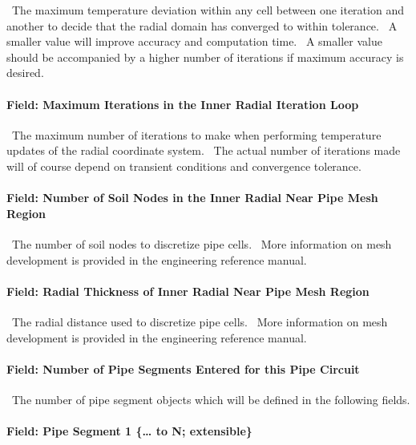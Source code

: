 ~The maximum temperature deviation within any cell between one iteration and another to decide that the radial domain has converged to within tolerance.~ A smaller value will improve accuracy and computation time.~ A smaller value should be accompanied by a higher number of iterations if maximum accuracy is desired.

\paragraph{Field: Maximum Iterations in the Inner Radial Iteration Loop}\label{field-maximum-iterations-in-the-inner-radial-iteration-loop}

~The maximum number of iterations to make when performing temperature updates of the radial coordinate system.~ The actual number of iterations made will of course depend on transient conditions and convergence tolerance.

\paragraph{Field: Number of Soil Nodes in the Inner Radial Near Pipe Mesh Region}\label{field-number-of-soil-nodes-in-the-inner-radial-near-pipe-mesh-region}

~The number of soil nodes to discretize pipe cells.~ More information on mesh development is provided in the engineering reference manual.

\paragraph{Field: Radial Thickness of Inner Radial Near Pipe Mesh Region}\label{field-radial-thickness-of-inner-radial-near-pipe-mesh-region}

~The radial distance used to discretize pipe cells.~ More information on mesh development is provided in the engineering reference manual.

\paragraph{Field: Number of Pipe Segments Entered for this Pipe Circuit}\label{field-number-of-pipe-segments-entered-for-this-pipe-circuit}

~The number of pipe segment objects which will be defined in the following fields.

\paragraph{Field: Pipe Segment 1 \{\ldots{} to N; extensible\}}\label{field-pipe-segment-1-to-n-extensible}

